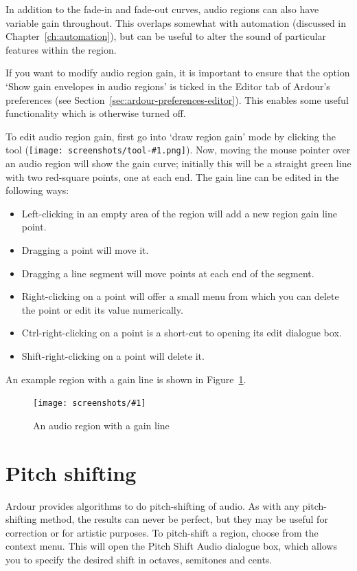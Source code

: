 \documentclass[10pt,a4paper]{book}
\newcommand{\dialogue}[1]{#1}
\newcommand{\tab}[1]{#1}
\newcommand{\menu}[1]{\emph{\StrSubstitute{#1}{,}{ $\rightarrow$ }}}
\newcommand{\modone}{Ctrl}
\newcommand{\modtertiary}{Shift}
\newcommand{\screenshot}[3]{%
\begin{figure}[ht]%
\begin{center}
\texttt{[image: screenshots/\#1]}
\end{center}
\caption{#2}
\label{#3}
\end{figure}}
\newcommand{\inlinetool}[1]{\texttt{[image: screenshots/tool-\#1.png]}}
\begin{document}
In addition to the fade-in and fade-out curves, audio regions can also
have variable gain throughout.  This overlaps somewhat with automation
(discussed in Chapter~\ref{ch:automation}), but can be useful to alter
the sound of particular features within the region.

If you want to modify audio region gain, it is important to ensure
that the option `Show gain envelopes in audio regions' is ticked in
the \tab{Editor} tab of Ardour's preferences (see
Section~\ref{sec:ardour-preferences-editor}).  This enables some
useful functionality which is otherwise turned off.

To edit audio region gain, first go into `draw region gain' mode by
clicking the tool (\inlinetool{region-gain}).  Now,
moving the mouse pointer over an audio region will show the gain
curve; initially this will be a straight green line with two
red-square points, one at each end.  The gain line can be edited in
the following ways:

\begin{itemize}
\item Left-clicking in an empty area of the region will add a new
  region gain line point.
\item Dragging a point will move it.
\item Dragging a line segment will move points at each end of the segment.
\item Right-clicking on a point will offer a small
  menu from which you can delete the point or edit its value
  numerically.
\item \modone{}-right-clicking on a point is a short-cut to opening
  its edit dialogue box.
\item \modtertiary{}-right-clicking on a point will delete it.
\end{itemize}

An example region with a gain line is shown in
Figure~\ref{fig:region-with-gain-line}.

\screenshot{region-gain-line.png}{An audio region with a gain line}{fig:region-with-gain-line}




\section{Pitch shifting}

Ardour provides algorithms to do pitch-shifting of audio.  As with any
pitch-shifting method, the results can never be perfect, but they may
be useful for correction or for artistic purposes.  To pitch-shift a
region, choose \menu{Edit,Pitch Shift\ldots} from the context menu.
This will open the \dialogue{Pitch Shift Audio} dialogue box, which allows
you to specify the desired shift in octaves, semitones and cents.
\end{document}
